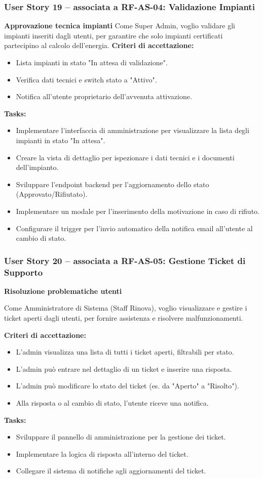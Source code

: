 \subsubsection*{User Story 19 – associata a RF-AS-04: Validazione Impianti}
\textbf{Approvazione tecnica impianti}
Come Super Admin, voglio validare gli impianti inseriti dagli utenti, per garantire che solo impianti certificati partecipino al calcolo dell'energia.
\textbf{Criteri di accettazione:}
\begin{itemize}
    \item Lista impianti in stato "In attesa di validazione".
    \item Verifica dati tecnici e switch stato a "Attivo".
    \item Notifica all'utente proprietario dell'avvenuta attivazione.
\end{itemize}
\textbf{Tasks:}
\begin{itemize}
    \item Implementare l'interfaccia di amministrazione per visualizzare la lista degli impianti in stato "In attesa".
    \item Creare la vista di dettaglio per ispezionare i dati tecnici e i documenti dell'impianto.
    \item Sviluppare l'endpoint backend per l'aggiornamento dello stato (Approvato/Rifiutato).
    \item Implementare un modale per l'inserimento della motivazione in caso di rifiuto.
    \item Configurare il trigger per l'invio automatico della notifica email all'utente al cambio di stato.
\end{itemize}

\subsubsection*{User Story 20 – associata a RF-AS-05: Gestione Ticket di Supporto}
\textbf{Risoluzione problematiche utenti}

Come Amministratore di Sistema (Staff Rinova), voglio visualizzare e gestire i ticket aperti dagli utenti, per fornire assistenza e risolvere malfunzionamenti.

\textbf{Criteri di accettazione:}
\begin{itemize}
    \item L'admin visualizza una lista di tutti i ticket aperti, filtrabili per stato.
    \item L'admin può entrare nel dettaglio di un ticket e inserire una risposta.
    \item L'admin può modificare lo stato del ticket (es. da "Aperto" a "Risolto").
    \item Alla risposta o al cambio di stato, l'utente riceve una notifica.
\end{itemize}
\textbf{Tasks:}
\begin{itemize}
    \item Sviluppare il pannello di amministrazione per la gestione dei ticket.
    \item Implementare la logica di risposta all'interno del ticket.
    \item Collegare il sistema di notifiche agli aggiornamenti del ticket.
\end{itemize}